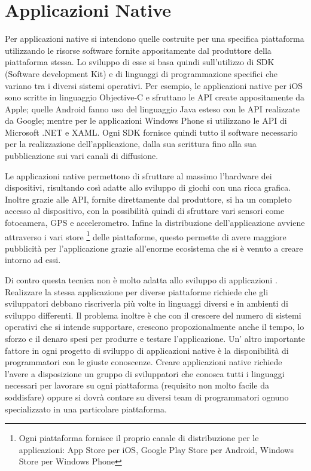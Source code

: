     \section{Applicazioni Native}
    \label{sec:nativapp}
        Per applicazioni native si intendono quelle costruite per una specifica
        piattaforma utilizzando le risorse software fornite appositamente dal
        produttore della piattaforma stessa.
        Lo sviluppo di esse si basa quindi sull'utilizzo di SDK
        (Software development Kit) e di
        linguaggi di programmazione specifici che variano tra i diversi
        sistemi operativi. Per esempio,
        le applicazioni native per iOS sono scritte in linguaggio Objective-C
        e sfruttano le API create appositamente da Apple; quelle Android fanno
        uso del linguaggio Java esteso con le API realizzate da Google; mentre
        per le applicazioni Windows Phone si utilizzano le API di
        Microsoft .NET e XAML. Ogni SDK fornisce quindi tutto il software necessario
        per la realizzazione dell'applicazione, dalla sua scrittura fino alla
        sua pubblicazione sui vari canali di diffusione.

        Le applicazioni native permettono di sfruttare al massimo l'hardware
        dei dispositivi, risultando così adatte allo sviluppo di giochi con
        una ricca grafica. Inoltre grazie alle
        API, fornite direttamente dal produttore, si ha un completo accesso al
        dispositivo, con la possibilità quindi di sfruttare vari sensori
        come fotocamera, GPS e accelerometro. Infine la distribuzione
        dell'applicazione avviene attraverso i vari store \footnote{Ogni
        piattaforma
        fornisce il proprio canale di distribuzione per le applicazioni:
        App Store per iOS, Google Play Store per Android, Windows Store per
        Windows Phone} delle piattaforme, questo permette di avere maggiore
        pubblicità per l'applicazione grazie all'enorme ecosistema che si è
        venuto a creare intorno ad essi.

        Di contro questa tecnica non è molto adatta allo sviluppo di
        applicazioni \crossplat{}. Realizzare la stessa applicazione per
        diverse piattaforme richiede che gli sviluppatori debbano riscriverla
        più volte in linguaggi diversi e in ambienti di
        sviluppo differenti. Il problema inoltre è che con il crescere del
        numero di sistemi operativi che si intende supportare, crescono
        propozionalmente anche il tempo, lo
        sforzo e il denaro spesi per produrre e testare l'applicazione.
        Un' altro importante fattore in ogni progetto di sviluppo di
        applicazioni native \crossplat{} è la disponibilità di programmatori
        con le giuste conoscenze. Creare applicazioni native richiede
        l'avere a disposizione un gruppo di sviluppatori che conosca tutti i
        linguaggi necessari per lavorare su ogni piattaforma (requisito
        non molto facile da soddisfare) oppure si dovrà contare su diversi team
        di programmatori ognuno specializzato in una particolare piattaforma.

